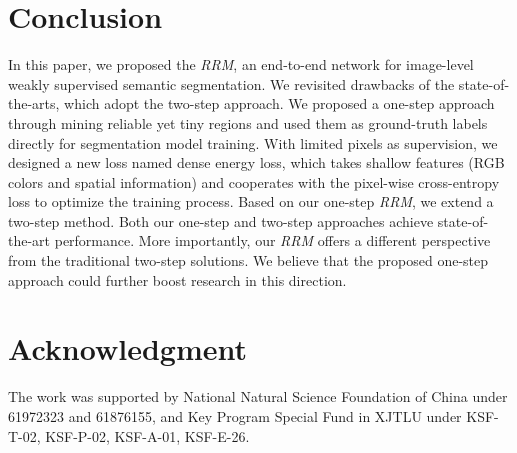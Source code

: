 \documentclass[letterpaper]{article} \usepackage{aaai20}  \usepackage{times}  \usepackage{helvet} \usepackage{courier}  \usepackage[hyphens]{url}  \usepackage{graphicx} \urlstyle{rm} \def\UrlFont{\rm}  \usepackage{graphicx}  \frenchspacing  \setlength{\pdfpagewidth}{8.5in}  \setlength{\pdfpageheight}{11in}
\begin{document}
\section{Conclusion}

In this paper, we proposed the \emph{RRM}, an end-to-end network for image-level weakly supervised semantic segmentation. We revisited drawbacks of the state-of-the-arts, which adopt the two-step approach. We proposed a one-step approach through mining reliable yet tiny regions and used them as ground-truth labels directly for segmentation model training. 
With limited pixels as supervision, we designed a new loss named dense energy loss, which takes shallow features (RGB colors and spatial information) and cooperates with the pixel-wise cross-entropy loss to optimize the training process. Based on our one-step \emph{RRM}, we extend a two-step method. Both our one-step and two-step approaches achieve state-of-the-art performance. More importantly, our \emph{RRM} offers a different perspective from the traditional two-step solutions. We believe that  the proposed one-step approach could further boost research in this direction.

\section{Acknowledgment}
The work was supported by National Natural Science Foundation of China under 61972323 and 61876155, and Key Program Special Fund in XJTLU under KSF-T-02, KSF-P-02, KSF-A-01, KSF-E-26.



\end{document}
